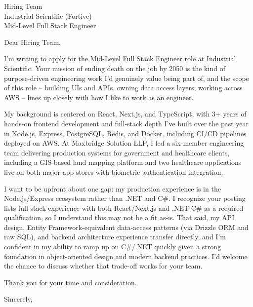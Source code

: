 \documentclass[11pt]{letter}
\begin{document}
\begin{letter}{Hiring Team \\ Industrial Scientific (Fortive) \\ Mid-Level Full Stack Engineer}

\opening{Dear Hiring Team,}

I'm writing to apply for the Mid-Level Full Stack Engineer role at Industrial Scientific. Your mission of ending death on the job by 2050 is the kind of purpose-driven engineering work I'd genuinely value being part of, and the scope of this role -- building UIs and APIs, owning data access layers, working across AWS -- lines up closely with how I like to work as an engineer.

My background is centered on React, Next.js, and TypeScript, with 3+ years of hands-on frontend development and full-stack depth I've built over the past year in Node.js, Express, PostgreSQL, Redis, and Docker, including CI/CD pipelines deployed on AWS. At Maxbridge Solution LLP, I led a six-member engineering team delivering production systems for government and healthcare clients, including a GIS-based land mapping platform and two healthcare applications live on both major app stores with biometric authentication integration.

I want to be upfront about one gap: my production experience is in the Node.js/Express ecosystem rather than .NET and C\#. I recognize your posting lists full-stack experience with both React/Next.js and .NET C\# as a required qualification, so I understand this may not be a fit as-is. That said, my API design, Entity Framework-equivalent data-access patterns (via Drizzle ORM and raw SQL), and backend architecture experience transfer directly, and I'm confident in my ability to ramp up on C\#/.NET quickly given a strong foundation in object-oriented design and modern backend practices. I'd welcome the chance to discuss whether that trade-off works for your team.

Thank you for your time and consideration.

\closing{Sincerely,}

\end{letter}
\end{document}
